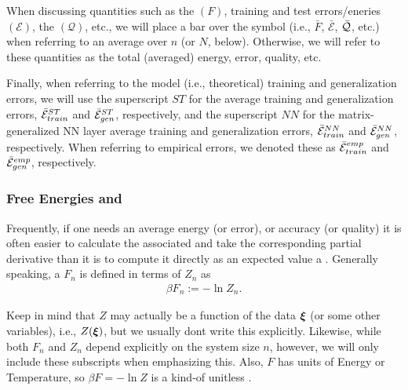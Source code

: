 When discussing quantities such as the \FreeEnergy $(F)$, 
training and test errors/eneries $(\mathcal{E})$, 
the \LayerQuality $(\mathcal{Q})$, etc.,
we will place a bar over the symbol (i.e., $\bar{F}$, $\bar{\mathcal{E}}$, $\bar{\mathcal{Q}}$, etc.) when referring to
an average over $n$ (or $N$, below). 
Otherwise, we will refer to these quantities as the total (averaged) energy, error, quality, etc.


Finally, when referring to the model (i.e., theoretical)
training and generalization errors, we will use the superscript $ST$ for
the average \StudentTeacher training and generalization errors, $\bar{\mathcal{E}}^{ST}_{train}$ and $\bar{\mathcal{E}}^{ST}_{gen}$, respectively, and
the superscript $NN$ for the matrix-generalized NN layer average
training and generalization errors, $\bar{\mathcal{E}}^{NN}_{train}$ and $\bar{\mathcal{E}}^{NN}_{gen}$, respectively.
When referring to empirical errors, we denoted these as $\bar{\mathcal{E}}^{emp}_{train}$ and $\bar{\mathcal{E}}^{emp}_{gen}$, respectively.


\subsubsection{Free Energies and \GeneratingFunctions} 
\label{sxn:mathP_free_energies}


Frequently, if one needs an average energy (or error), or accuracy (or quality)
it is often easier to calculate the associated \FreeEnergy and take the corresponding partial derivative
than it is to compute it directly as an expected value a \ThermalAverage.
Generally speaking, a \FreeEnergy $F_n$ is defined in terms of $Z_{n}$ as
\begin{align}
\label{eqn:F}
\beta F_n:=-\ln Z_{n}.
\end{align}


Keep in mind that $Z$ may actually be a function of the data $\boldsymbol{\xi}$ (or some other variables),
i.e., $Z(\boldsymbol{\xi})$, but we usually dont write this explicitly.
Likewise, while  both $F_n$ and $Z_n$ depend explicitly on the system size $n$, however,
we will only include these subscripts when emphasizing this.
Also, $F$ has units of Energy or Temperature, so $\beta F=-\ln Z$ is a kind-of unitless \FreeEnergy.

